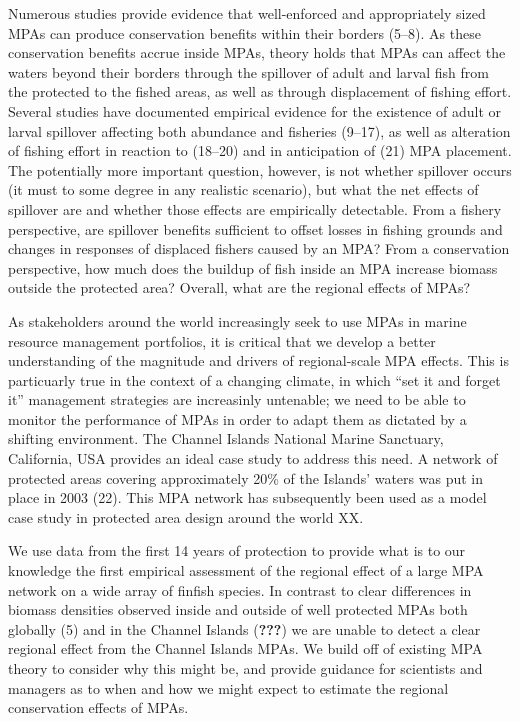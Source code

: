 \documentclass[9pt,twocolumn,twoside,lineno]{pnas-new}
\begin{document}
Numerous studies provide evidence that well-enforced and appropriately
sized MPAs can produce conservation benefits within their borders
(5--8). As these conservation benefits accrue inside MPAs, theory holds
that MPAs can affect the waters beyond their borders through the
spillover of adult and larval fish from the protected to the fished
areas, as well as through displacement of fishing effort. Several
studies have documented empirical evidence for the existence of adult or
larval spillover affecting both abundance and fisheries (9--17), as well
as alteration of fishing effort in reaction to (18--20) and in
anticipation of (21) MPA placement. The potentially more important
question, however, is not whether spillover occurs (it must to some
degree in any realistic scenario), but what the net effects of spillover
are and whether those effects are empirically detectable. From a fishery
perspective, are spillover benefits sufficient to offset losses in
fishing grounds and changes in responses of displaced fishers caused by
an MPA? From a conservation perspective, how much does the buildup of
fish inside an MPA increase biomass outside the protected area? Overall,
what are the regional effects of MPAs?

As stakeholders around the world increasingly seek to use MPAs in marine
resource management portfolios, it is critical that we develop a better
understanding of the magnitude and drivers of regional-scale MPA
effects. This is particuarly true in the context of a changing climate,
in which ``set it and forget it'' management strategies are increasinly
untenable; we need to be able to monitor the performance of MPAs in
order to adapt them as dictated by a shifting environment. The Channel
Islands National Marine Sanctuary, California, USA provides an ideal
case study to address this need. A network of protected areas covering
approximately 20\% of the Islands' waters was put in place in 2003 (22).
This MPA network has subsequently been used as a model case study in
protected area design around the world XX.

We use data from the first 14 years of protection to provide what is to
our knowledge the first empirical assessment of the regional effect of a
large MPA network on a wide array of finfish species. In contrast to
clear differences in biomass densities observed inside and outside of
well protected MPAs both globally (5) and in the Channel Islands
({\textbf{???}}) we are unable to detect a clear regional effect from
the Channel Islands MPAs. We build off of existing MPA theory to
consider why this might be, and provide guidance for scientists and
managers as to when and how we might expect to estimate the regional
conservation effects of MPAs.
\end{document}
